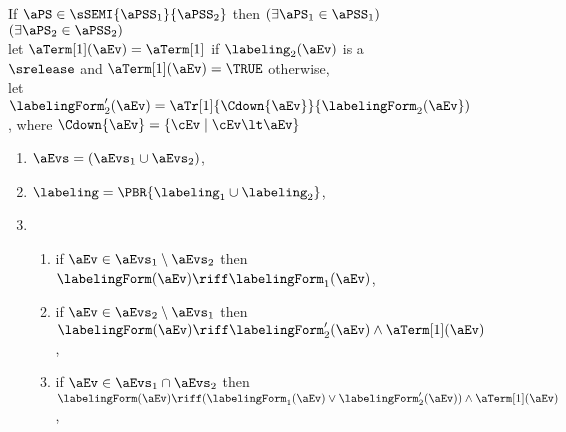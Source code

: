 \begin{figure}
  \noindent
  If $\aPS \in \sSEMI{\aPSS_1}{\aPSS_2}$ then $(\exists\aPS_1\in\aPSS_1)$
  $(\exists\aPS_2\in\aPSS_2)$\\
  let $\aTerm[1](\aEv) = \aTerm[1]$ if $\labeling_2(\aEv)$ is a $\srelease$
  and $\aTerm[1](\aEv) = \TRUE$ otherwise,\\
  let $\labelingForm'_2(\aEv)=\aTr[1]{\Cdown{\aEv}}{\labelingForm_2(\aEv})$,
  where
  $\Cdown{\aEv}=\{ \cEv \mid \cEv \lt \aEv \}$%
  \begin{multicols}{2}
    \begin{enumerate}[topsep=0pt,label=(\textsc{s}\arabic*),ref=\textsc{s}\arabic*]
    \item \label{seq-E}
      $\aEvs = (\aEvs_1\cup\aEvs_2)$,
    \item \label{seq-lambda}
      ${\labeling}=\PBR{{\labeling_1}\cup {\labeling_2}}$, 
    \item[] 
      \begin{enumerate}[leftmargin=0pt]
      \item \label{seq-kappa1}
        if $\aEv\in\aEvs_1\setminus\aEvs_2$ then $\labelingForm(\aEv) \riff \labelingForm_1(\aEv)$,
      \item \label{seq-kappa2}
        if $\aEv\in\aEvs_2\setminus\aEvs_1$ then $\labelingForm(\aEv) \riff \labelingForm'_2(\aEv) \land \aTerm[1](\aEv)$,
      \item \label{seq-kappa12}
        if $\aEv\in\aEvs_1\cap\aEvs_2$ then $\labelingForm(\aEv) \riff (\labelingForm_1(\aEv)\lor\labelingForm'_2(\aEv)) \land \aTerm[1](\aEv)$,

\end{enumerate}
\end{enumerate}
\end{multicols}
\end{figure}
